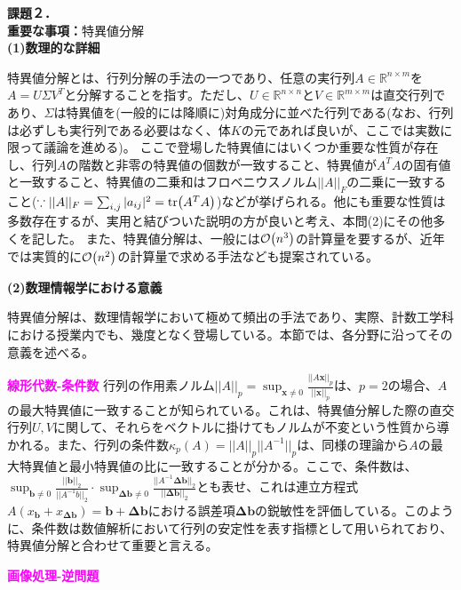 \documentclass[10pt]{article}
\begin{document}
\noindent
{\bf 課題２．}\\

\noindent
{\bf 重要な事項：}特異値分解\\

\noindent
{\bf (1)数理的な詳細}

特異値分解とは、行列分解の手法の一つであり、任意の実行列$A \in \mathbb{R}^{n \times m}$を$A = U \Sigma V^T$と分解することを指す。ただし、$U \in \mathbb{R}^{n \times n}$と$V \in \mathbb{R}^{m \times m}$は直交行列であり、$\Sigma$は特異値を(一般的には降順に)対角成分に並べた行列である(なお、行列は必ずしも実行列である必要はなく、体$K$の元であれば良いが、ここでは実数に限って議論を進める)。
ここで登場した特異値にはいくつか重要な性質が存在し、行列$A$の階数と非零の特異値の個数が一致すること、特異値が$A^TA$の固有値と一致すること、特異値の二乗和はフロベニウスノルム$||A||_F$の二乗に一致すること($\because ||A||_F=\sum_{i,j}|a_{ij}|^2=\tr(A^TA)$)などが挙げられる。他にも重要な性質は多数存在するが、実用と結びついた説明の方が良いと考え、本問(2)にその他多くを記した。
また、特異値分解は、一般には$\order{n^3}$の計算量を要するが、近年では実質的に$\order{n^2}$の計算量で求める手法なども提案されている\cite{YouZuoTeYiZhiFenJiearugorizumunoZuiJinnoFaZhan2014}。

\noindent
{\bf (2)数理情報学における意義}

特異値分解は、数理情報学において極めて頻出の手法であり、実際、計数工学科における授業内でも、幾度となく登場している。本節では、各分野に沿ってその意義を述べる。

\noindent
{\bf \textcolor{magenta}{線形代数-条件数}}\quad
行列の作用素ノルム$||A||_p=\sup_{\bm{x} \neq 0}\frac{||A\bm{x}||_p}{||\bm{x}||_p}$は、$p=2$の場合、$A$の最大特異値に一致することが知られている。これは、特異値分解した際の直交行列$U,V$に関して、それらをベクトルに掛けてもノルムが不変という性質から導かれる。また、行列の条件数$\kappa_p(A)=||A||_p||A^{-1}||_p$は、同様の理論から$A$の最大特異値と最小特異値の比に一致することが分かる。ここで、条件数は、$\sup_{\bm{b} \neq 0}\frac{||\bm{b}||_2}{||A^{-1}b||_2} \cdot \sup_{\bm{\Delta b} \neq 0}\frac{||A^{-1}\bm{\Delta b}||_2}{||\bm{\Delta b}||_2}$とも表せ、これは連立方程式$A(x_{\bm{b}}+x_{\bm{\Delta b}})=\bm{b}+\bm{\Delta b}$における誤差項$\bm{\Delta b}$の鋭敏性を評価している。このように、条件数は数値解析において行列の安定性を表す指標として用いられており、特異値分解と合わせて重要と言える\cite{SongWeiShuZhiJieXiDi2ZhangXianXingFangChengShiLianLiYiCiFangChengShi2021}。

\noindent
{\bf \textcolor{magenta}{画像処理-逆問題}}\quad
\end{document}
